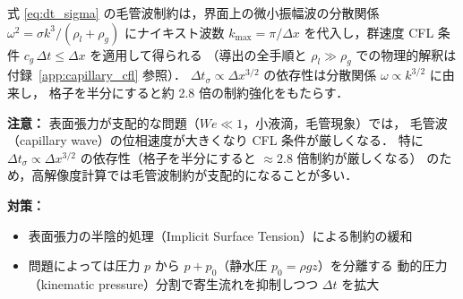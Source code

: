 式 \eqref{eq:dt_sigma} の毛管波制約は，界面上の微小振幅波の分散関係
$\omega^2 = \sigma k^3/(\rho_l+\rho_g)$ にナイキスト波数 $k_{\max}=\pi/\Delta x$
を代入し，群速度 CFL 条件 $c_g\,\Delta t \le \Delta x$ を適用して得られる
（導出の全手順と $\rho_l\gg\rho_g$ での物理的解釈は付録~\ref{app:capillary_cfl} 参照）．
$\Delta t_\sigma \propto \Delta x^{3/2}$ の依存性は分散関係 $\omega\propto k^{3/2}$ に由来し，
格子を半分にすると約 2.8 倍の制約強化をもたらす．

\noindent\textbf{注意：}
表面張力が支配的な問題（$We \ll 1$，小液滴，毛管現象）では，
毛管波（capillary wave）の位相速度が大きくなり CFL 条件が厳しくなる．
特に $\Delta t_\sigma \propto \Delta x^{3/2}$ の依存性（格子を半分にすると $\approx 2.8$ 倍制約が厳しくなる）
のため，高解像度計算では毛管波制約が支配的になることが多い．

\textbf{対策：}
\begin{itemize}
  \item 表面張力の半陰的処理（Implicit Surface Tension）による制約の緩和
  \item 問題によっては圧力 $p$ から $p + p_0$（静水圧 $p_0 = \rho g z$）を分離する
        動的圧力（kinematic pressure）分割で寄生流れを抑制しつつ $\Delta t$ を拡大
\end{itemize}
